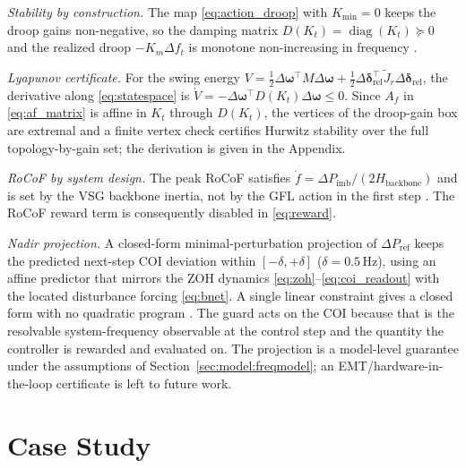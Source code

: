 \documentclass[lettersize,journal]{IEEEtran}
\begin{document}
\emph{Stability by construction.} The map \eqref{eq:action_droop} with $K_{\min}=0$ keeps the droop gains non-negative, so the damping matrix
$D(K_t)=\operatorname{diag}(K_t)\succeq 0$ and the realized droop $-K_m\Delta f_t$ is monotone non-increasing in frequency \cite{feng2022stabilityrl,alduaij2025partialmonotone}.

\emph{Lyapunov certificate.} For the swing energy $V=\tfrac12\Delta\boldsymbol{\omega}^{\!\top}M\Delta\boldsymbol{\omega}+\tfrac12\Delta\boldsymbol{\delta}_{\mathrm{rel}}^{\!\top}\tilde{J}_r\Delta\boldsymbol{\delta}_{\mathrm{rel}}$, the derivative along \eqref{eq:statespace} is $\dot V=-\Delta\boldsymbol{\omega}^{\!\top}D(K_t)\Delta\boldsymbol{\omega}\le0$.
Since $A_f$ in \eqref{eq:af_matrix} is affine in $K_t$ through $D(K_t)$, the vertices of the droop-gain box are extremal and a finite vertex check certifies Hurwitz stability over the full topology-by-gain set; the derivation is given in the Appendix.

\emph{RoCoF by system design.} The peak RoCoF satisfies $\dot f=\Delta P_{\mathrm{imb}}/(2H_{\mathrm{backbone}})$ and is set by the VSG backbone inertia, not by the GFL action in the first step \cite{kenyon2021gfmfreqorder}. The RoCoF reward term is consequently disabled in \eqref{eq:reward}.

\emph{Nadir projection.} A closed-form minimal-perturbation projection of $\Delta P_{\mathrm{ref}}$ keeps the predicted next-step COI deviation within $[-\delta,+\delta]$ ($\delta=0.5$\,Hz), using an affine predictor that mirrors the ZOH dynamics \eqref{eq:zoh}--\eqref{eq:coi_readout} with the located disturbance forcing \eqref{eq:bnet}. A single linear constraint gives a closed form with no quadratic program \cite{tabas2021safefilter}. The guard acts on the COI because that is the resolvable system-frequency observable at the control step and the quantity the controller is rewarded and evaluated on. The projection is a model-level guarantee under the assumptions of Section~\ref{sec:model:freqmodel}; an EMT/hardware-in-the-loop certificate is left to future work.

\section{Case Study}
\label{sec:casestudy}


\end{document}
